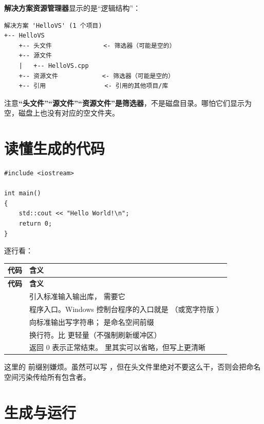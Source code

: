 \textbf{解决方案资源管理器}显示的是“逻辑结构”：

\begin{lstlisting}[style=textstyle]
解决方案 'HelloVS' (1 个项目)
+-- HelloVS
    +-- 头文件              <- 筛选器（可能是空的）
    +-- 源文件
    |   +-- HelloVS.cpp
    +-- 资源文件            <- 筛选器（可能是空的）
    +-- 引用                <- 引用的其他项目/库
\end{lstlisting}

注意\textbf{“头文件”“源文件”“资源文件”是筛选器}，不是磁盘目录。哪怕它们显示为空，磁盘上也没有对应的空文件夹。

\section{读懂生成的代码}

\begin{lstlisting}[style=cppstyle]
#include <iostream>

int main()
{
    std::cout << "Hello World!\n";
    return 0;
}
\end{lstlisting}

逐行看：

\begin{longtable}{L{4.8cm}L{10.2cm}}\toprule
\textbf{代码} & \textbf{含义} \\ \midrule \endfirsthead
\toprule \textbf{代码} & \textbf{含义} \\ \midrule \endhead
\bottomrule \endlastfoot
{} & 引入标准输入输出库， 需要它 \\
 & 程序入口。Windows 控制台程序的入口就是 （或宽字符版 ） \\
 & 向标准输出写字符串； 是命名空间前缀 \\
 & 换行符。比  更轻量（不强制刷新缓冲区） \\
 & 返回 0 表示正常结束。 里其实可以省略，但写上更清晰 \\
\end{longtable}

\begin{tipbox}[提示]
这里的  前缀别嫌烦。虽然可以写 ，但在头文件里绝对不要这么干，否则会把命名空间污染传给所有包含者。
\end{tipbox}

\section{生成与运行}

